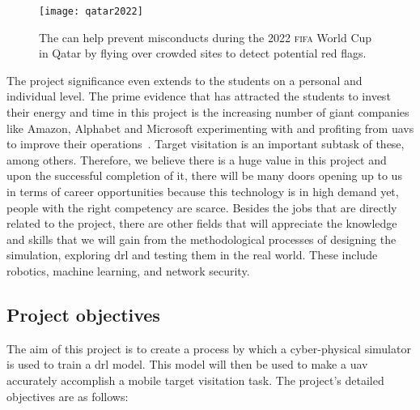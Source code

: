 \documentclass[../main.tex]{subfiles}
\begin{document}
\begin{figure}[tb] 
    \centering
    \texttt{[image: qatar2022]} 
    \caption{The \uav can help prevent misconducts during
    the 2022 \textsc{fifa} World Cup in Qatar by flying 
    over crowded sites to detect potential red flags.} 
    \label{fig:fifa} 
\end{figure}

The project significance even extends to the students
on a personal and individual level.
The prime evidence that has attracted the students to invest
their energy and time in this project is
the increasing number of giant companies like Amazon, Alphabet
and Microsoft experimenting with and profiting from \glspl{uav}
to improve their operations~\cite{Jun17}.
Target visitation is an important subtask of these, among others.
Therefore, we believe there is a huge value
in this project and upon the successful completion of it,
there will be many doors opening up to us in terms of
career opportunities because 
this technology is in high demand yet, 
people with the right competency
are scarce.
Besides the jobs that are directly related to the project,
there are other fields that will appreciate the knowledge
and skills that we will gain from the methodological processes 
of designing the simulation,
exploring \gls{drl} and testing them in the real world.
These include robotics, machine learning, and 
network security.

\subsection{Project objectives}\label{sec:objectives}

The aim of this project is to create a process 
by which a cyber-physical simulator is used to train 
a \gls{drl} model. This model will then be used
to make a \gls{uav} accurately accomplish a
mobile target visitation task.
The project's detailed objectives are as follows:
\end{document}
